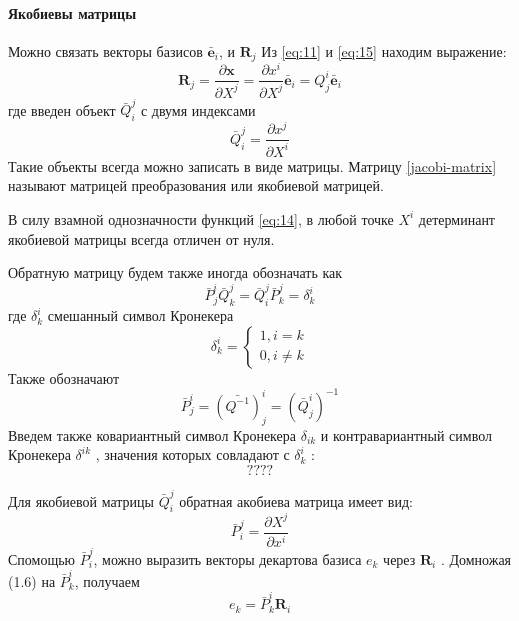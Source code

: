 \paragraph {Якобиевы матрицы}
Можно связать векторы базисов $\bar{\textbf{e}}_i$, и $\textbf{R}_j$  Из \eqref{eq:11}  и \eqref{eq:15} находим выражение:
\begin{equation}
\label{eq:16}
    \textbf{R}_j = \frac{\partial\textbf{x}}{\partial X^j} = \frac{\partial x^i}{\partial X^j} \bar{\textbf{e}}_i = Q^i_j \bar{\textbf{e}}_i
\end{equation}
где введен объект $\bar{Q}^j_i$ с двумя индексами
\begin{equation}\label{jacobi-matrix}
    \bar{Q}^j_i= \frac{\partial x^j}{\partial X^i}
\end{equation}
Такие объекты всегда можно записать в виде матрицы. Матрицу \eqref{jacobi-matrix} называют матрицей преобразования или якобиевой матрицей.

В силу взамной однозначности функций \eqref{eq:14}, в любой точке $X^i$ детерминант якобиевой матрицы всегда отличен от нуля.

Обратную матрицу будем также иногда обозначать как 
\begin{equation}
\label{eq:19}
    \bar{P}^i_j\bar{Q}^j_k = \bar{Q}^j_i\bar{P}^j_k  = \delta^i_k
\end{equation}
где $\delta^i_k$ смешанный символ Кронекера
\begin{equation}
\label{eq:110}
    \delta^i_k = \begin{cases}
    1, i = k\\
    0, i \ne k
    \end{cases}
\end{equation}
Также обозначают
\begin{equation}
    \bar{P}^i_j= (\bar{Q^{-1}})^i_j   = (\bar{Q}^i_j)^{-1} 
\end{equation}
Введем также ковариантный символ Кронекера $\delta_{ik}$  и контравариантный символ Кронекера $\delta^{ik}$ , значения которых совладают с $\delta^i_k$ :
\begin{equation}
\label{eq:110}
	\textbf{????}
\end{equation}

Для якобиевой матрицы $\bar{Q}^j_i$ обратная акобиева матрица имеет вид:
\begin{equation}
\label{eq:111}
    \bar{P}^j_i= \frac{\partial X^j}{\partial x^i}
\end{equation}
Спомощью $\bar{P}^j_i$, можно выразить векторы декартова базиса $e_k$ через $\textbf{R}_i$ . Домножая (1.6) на $\bar{P}^i_k$, получаем
\begin{equation}
\label{eq:112}
    e_k = \bar{P}^i_k \textbf{R}_i
\end{equation}
